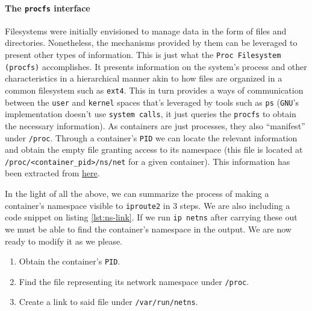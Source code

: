                 \paragraph{The \texttt{procfs} interface}
                    Filesystems were initially envisioned to manage data in the form of files and directories. Nonetheless, the mechanisms provided by them can be leveraged to present other types of information. This is just what the \texttt{Proc Filesystem (procfs)} accomplishes. It presents information on the system's process and other characteristics in a hierarchical manner akin to how files are organized in a common filesystem such as \texttt{ext4}. This in turn provides a ways of communication between the \texttt{user} and \texttt{kernel} spaces that's leveraged by tools such as \texttt{ps} (\texttt{GNU}'s implementation doesn't use \texttt{system calls}, it just queries the \texttt{procfs} to obtain the necessary information). As containers are just processes, they also ``manifest'' under \texttt{/proc}. Through a container's \texttt{PID} we can locate the relevant information and obtain the empty file granting access to its namespace (this file is located at \texttt{/proc/<container\_pid>/ns/net} for a given container). This information has been extracted from \href{https://en.wikipedia.org/wiki/Procfs}{here}.

                In the light of all the above, we can summarize the process of making a container's namespace visible to \texttt{iproute2} in $3$ steps. We are also including a code snippet on listing \ref{lst:ns-link}. If we run \texttt{ip netns} after carrying these out we must be able to find the container's namespace in the output. We are now ready to modify it as we please.

                \begin{enumerate}
                    \item Obtain the container's \texttt{PID}.
                    \item Find the file representing its network namespace under \texttt{/proc}.
                    \item Create a link to said file under \texttt{/var/run/netns}.
                \end{enumerate}

